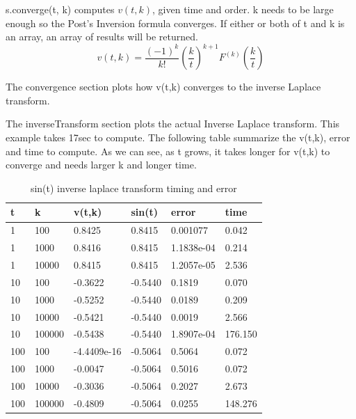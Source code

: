 \documentclass[12pt]{article}
\begin{document}
s.converge(t, k) computes $v(t, k)$, given time and order. k needs to be large enough so the Post's Inversion formula converges.
If either or both of t and k is an array, an array of results will be returned.
\begin{equation*}
v(t, k) = \frac{(-1)^{k}}{k!} \left(\frac{k}{t}\right)^{k+1}  F^{(k)} \left(\frac{k}{t}\right)
\end{equation*}

The convergence section plots how v(t,k) converges to the inverse Laplace transform.

The inverseTransform section plots the actual Inverse Laplace transform. This example takes 17sec to compute.
The following table summarize the v(t,k), error and time to compute. As we can see, as t grows, it takes longer for v(t,k) to converge and needs larger k and longer time.

\begin{table}
\caption {sin(t) inverse laplace transform timing and error} \label{tab:timing} 
\begin{center}
\begin{tabular}{| l | l | l | l | l | l |}
\hline
t  &  k   &  v(t,k) & sin(t) & error & time \\
\hline
1  &  100 &  0.8425 & 0.8415 & 0.001077 & 0.042 \\
\hline
1  &  1000 &  0.8416 & 0.8415 & 1.1838e-04 & 0.214 \\
\hline
1  &  10000 &  0.8415 & 0.8415 & 1.2057e-05 & 2.536 \\
\hline
10  &  100 &  -0.3622 & -0.5440 & 0.1819 & 0.070 \\
\hline
10  &  1000 &  -0.5252 & -0.5440 & 0.0189 & 0.209 \\
\hline
10  &  10000 &  -0.5421 & -0.5440 & 0.0019 & 2.566 \\
\hline
10  &  100000 &  -0.5438 & -0.5440 & 1.8907e-04 & 176.150\\
\hline
100  &  100 &  -4.4409e-16 & -0.5064 & 0.5064 & 0.072 \\
\hline
100  &  1000 &  -0.0047 & -0.5064 & 0.5016 & 0.072 \\
\hline
100  &  10000 &  -0.3036 & -0.5064 & 0.2027 & 2.673 \\
\hline
100  &  100000 &  -0.4809 & -0.5064 & 0.0255 & 148.276  \\
\hline
\end{tabular}
\end{center}
\end{table}
\end{document}
